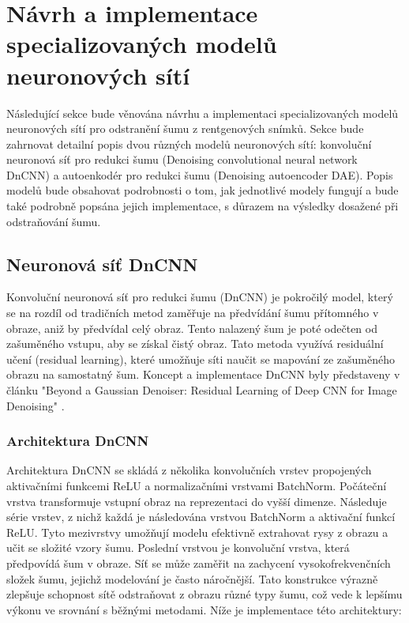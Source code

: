 \documentclass[male,czech,api_ing]{thesis}
\begin{document}
\section{Návrh a implementace specializovaných modelů neuronových sítí}
Následující sekce bude věnována návrhu a implementaci specializovaných modelů neuronových sítí pro odstranění šumu z rentgenových snímků. Sekce bude zahrnovat detailní popis dvou různých modelů neuronových sítí: konvoluční neuronová síť pro redukci šumu (Denoising convolutional neural network DnCNN) a autoenkodér pro redukci šumu (Denoising autoencoder DAE). Popis modelů bude obsahovat podrobnosti o tom, jak jednotlivé modely fungují a bude také podrobně popsána jejich implementace, s důrazem na výsledky dosažené při odstraňování šumu.

\subsection{Neuronová síť DnCNN}
Konvoluční neuronová síť pro redukci šumu (DnCNN) je pokročilý model, který se na rozdíl od tradičních metod zaměřuje na předvídání šumu přítomného v obraze, aniž by předvídal celý obraz. Tento nalazený šum je poté odečten od zašuměného vstupu, aby se získal čistý obraz. Tato metoda využívá residuální učení (residual learning), které umožňuje síti naučit se mapování ze zašuměného obrazu na samostatný šum. Koncept a implementace DnCNN byly představeny v článku "Beyond a Gaussian Denoiser: Residual Learning of Deep CNN for Image Denoising" \cite{DnCNN}.

\subsubsection{Architektura DnCNN}
Architektura DnCNN se skládá z několika konvolučních vrstev propojených aktivačními funkcemi ReLU a normalizačními vrstvami BatchNorm. Počáteční vrstva transformuje vstupní obraz na reprezentaci do vyšší dimenze. Následuje série vrstev, z nichž každá je následována vrstvou BatchNorm a aktivační funkcí ReLU. Tyto mezivrstvy umožňují modelu efektivně extrahovat rysy z obrazu a učit se složité vzory šumu. Poslední vrstvou je konvoluční vrstva, která předpovídá šum v obraze. Síť se může zaměřit na zachycení vysokofrekvenčních složek šumu, jejichž modelování je často náročnější. Tato konstrukce výrazně zlepšuje schopnost sítě odstraňovat z obrazu různé typy šumu, což vede k lepšímu výkonu ve srovnání s běžnými metodami. Níže je implementace této architektury:
\end{document}
